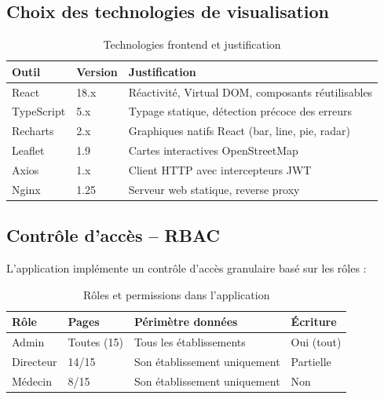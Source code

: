 \documentclass[12pt,a4paper]{report}
\begin{document}
	\subsection{Choix des technologies de visualisation}
	
	\begin{table}[H]
		\centering
		\caption{Technologies frontend et justification}
		\renewcommand{\arraystretch}{1.2}
		\begin{tabularx}{\textwidth}{llX}
			\toprule
			\textbf{Outil} & \textbf{Version} & \textbf{Justification} \\
			\midrule
			React        & 18.x   & Réactivité, Virtual DOM, composants réutilisables \\
			TypeScript   & 5.x    & Typage statique, détection précoce des erreurs \\
			Recharts     & 2.x    & Graphiques natifs React (bar, line, pie, radar) \\
			Leaflet      & 1.9    & Cartes interactives OpenStreetMap \\
			Axios        & 1.x    & Client HTTP avec intercepteurs JWT \\
			Nginx        & 1.25   & Serveur web statique, reverse proxy \\
			\bottomrule
		\end{tabularx}
	\end{table}
	
	\subsection{Contrôle d'accès -- RBAC}
	
	L'application implémente un contrôle d'accès granulaire basé sur les rôles :
	
	\begin{table}[H]
		\centering
		\caption{Rôles et permissions dans l'application}
		\renewcommand{\arraystretch}{1.2}
		\begin{tabularx}{\textwidth}{llXl}
			\toprule
			\textbf{Rôle} & \textbf{Pages} & \textbf{Périmètre données} & \textbf{Écriture} \\
			\midrule
			Admin     & Toutes (15) & Tous les établissements  & Oui (tout) \\
			Directeur & 14/15       & Son établissement uniquement & Partielle \\
			Médecin   & 8/15        & Son établissement uniquement & Non \\
			\bottomrule
		\end{tabularx}
	\end{table}
	
\end{document}
